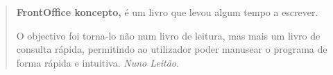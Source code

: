 \documentclass[a4paper,11pt,openany]{memoir}
\begin{document}
\endgroup

\clearpage
\vspace*{\fill}
\begin{quote}
\textbf{FrontOffice koncepto,} é um livro que levou algum tempo a escrever.

O objectivo foi torna-lo não num livro de leitura, mas mais um livro de consulta rápida,
permitindo ao utilizador poder manusear o programa de forma rápida e intuitiva.
  \hspace*{\fill} 
      \textit{Nuno Leitão}.
\end{quote}

% 




\vspace*{\fill}
\end{document}
